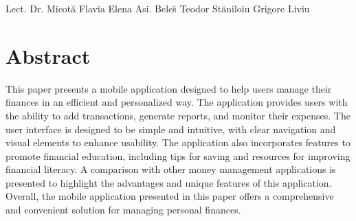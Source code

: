 \documentclass[12pt,a4paper]{book}
\newtheorem{thm}{Theorem}[section]
\theoremstyle{definition}
\newtheorem{defn}{Definition}[section]
\theoremstyle{remark}
\newtheorem{exmp}{Example}[section]
\begin{document}
{\large{}

\noindent Lect. Dr. Micot\u a Flavia Elena \newline Asi. Bele\u s Teodor  \hfill St\u aniloiu Grigore Liviu}

\vfill
 


\newpage
\normalsize{}

\section*{Abstract} 
 
This paper presents a mobile application designed to help users manage their finances in an efficient and personalized way. The application provides users with the ability to add transactions, generate reports, and monitor their expenses. The user interface is designed to be simple and intuitive, with clear navigation and visual elements to enhance usability. \newline
The application also incorporates features to promote financial education, including tips for saving and resources for improving financial literacy. A comparison with other money management applications is presented to highlight the advantages and unique features of this application. Overall, the mobile application presented in this paper offers a comprehensive and convenient solution for managing personal finances.


\newpage
\normalsize{}



\end{document}
